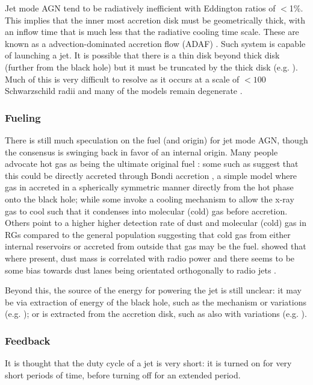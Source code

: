 		Jet mode AGN tend to be radiatively inefficient with Eddington ratios of $<$1\%. This implies that the inner most accretion disk must be geometrically thick, with an inflow time that is much less that the radiative cooling time scale. These are known as a advection-dominated accretion flow (ADAF) \citep{Narayan1994}. Such system is capable of launching a jet. It is possible that there is a thin disk beyond thick disk (further from the black hole) but it must be truncated by the thick disk (e.g. \citet{Abramowicz2002}). Much of this is very difficult to resolve as it occurs at a scale of $< 100$ Schwarzschild radii and many of the models remain degenerate \citep{Quataert1999}. 

		\subsubsection{Fueling}
			\label{subsubsec:JetFueling}
			There is still much speculation on the fuel (and origin) for jet mode AGN, though the consensus is swinging back in favor of an internal origin. Many people advocate hot gas as being the ultimate original fuel \citep{Allen2006}: some such as \citet{Hardcastle2007a} suggest that this could be directly accreted through Bondi accretion \citep{Bondi1952}, a simple model where gas in accreted in a spherically symmetric manner directly from the hot phase onto the black hole; while some invoke a cooling mechanism to allow the x-ray gas to cool such that it condenses into molecular (cold) gas before accretion. Others point to a higher higher detection rate of dust and molecular (cold) gas in RGs compared to the general population \citep{Lim2000, Lim2003, DeRuiter2002, VerdoesKleijn2005} suggesting that cold gas from either internal reservoirs or accreted from outside that gas may be the fuel. \citet{DeRuiter2002} showed that where present, dust mass is correlated with radio power and there seems to be some bias towards dust lanes being orientated orthogonally to radio jets \citep{VerdoesKleijn2005}. 

			Beyond this, the source of the energy for powering the jet is still unclear: it may be via extraction of energy of the black hole, such as the \citet{Blandford1977} mechanism or variations (e.g. \citet{Koide2002}); or is extracted from the accretion disk, such as \citet{Blandford1982} also with variations (e.g. \citet{Hujeirat2003}). 

		\subsubsection{Feedback}
			\label{subsubsection:JetFeedback}
			It is thought that the duty cycle of a jet is very short: it is turned on for very short periods of time, before turning off for an extended period. 

